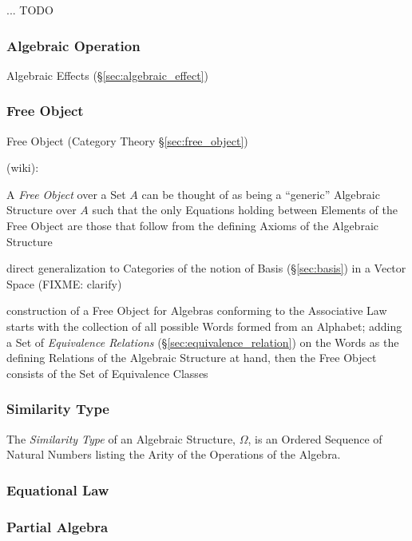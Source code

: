 ... TODO



\subsubsection{Algebraic Operation}\label{sec:algebraic_operation}

Algebraic Effects (\S\ref{sec:algebraic_effect})



\subsubsection{Free Object}\label{sec:universal_free_object}

\fist Free Object (Category Theory \S\ref{sec:free_object})

(wiki):

A \emph{Free Object} over a Set $A$ can be thought of as being a ``generic''
Algebraic Structure over $A$ such that the only Equations holding between
Elements of the Free Object are those that follow from the defining Axioms of
the Algebraic Structure

direct generalization to Categories of the notion of Basis (\S\ref{sec:basis})
in a Vector Space (FIXME: clarify)

construction of a Free Object for Algebras conforming to the Associative Law
starts with the collection of all possible Words formed from an Alphabet;
adding a Set of \emph{Equivalence Relations} (\S\ref{sec:equivalence_relation})
on the Words as the defining Relations of the Algebraic Structure at hand, then
the Free Object consists of the Set of Equivalence Classes



\subsubsection{Similarity Type}\label{sec:similarity_type}

The \emph{Similarity Type} of an Algebraic Structure, $\Omega$, is an
Ordered Sequence of Natural Numbers listing the Arity of the
Operations of the Algebra.



\subsubsection{Equational Law}\label{sec:equational_law}

\subsubsection{Partial Algebra}\label{sec:partial_algebra}


